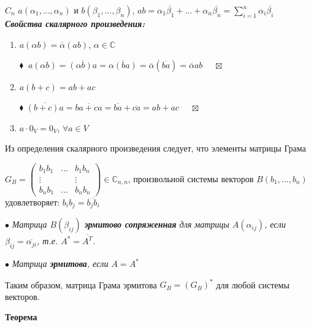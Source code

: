 \documentclass[a4paper, 12pt]{report}
\begin{document}
	$C_{n}$ $a(\alpha_{1}, ...  , \alpha_{n})$ и $b(\beta_{1}, ...  , \beta_{n})$, 
	$ab= \alpha_{1} \overline{\beta_{1}} + ... + \alpha_{n} \overline{\beta_{n}} = \sum\limits_{i=1}^{n}{\alpha_{i} \overline{\beta_{i}}}$\\
	\textit{ \textbf{Свойства скалярного произведения:}}
	\begin{enumerate}
		\item $a(\alpha b) = \overline{\alpha}(ab)$, $\alpha \in \mathbb{C}$
		\par\bigskip
		$\blacklozenge\ $
		$a(\alpha b) = \overline{(\alpha b)a}=\overline{\alpha(ba)}=\overline{\alpha}(\overline{ba})= \overline{\alpha}ab$
		$ \quad \boxtimes$
		
		\item $a(b + c) = ab + ac$
		\par\bigskip
		$\blacklozenge$
		$\overline{(b + c)a}=\overline{ba+ca}=\overline{ba} + \overline{ca} = ab + ac$
		$\quad\boxtimes$
		
		\item  $a \cdot 0_{V}=0_V$, $\forall a \in V$
		
	\end{enumerate}
	\par\bigskip
	Из определения скалярного произведения следует, что элементы матрицы Грама
	\par\bigskip
	$G_B=\begin{pmatrix}
		b_1b_1&...& b_1b_n\\ 
		\vdots &  & \vdots \\ 
		b_nb_1&...& b_nb_n
	\end{pmatrix}\in \mathbb{C}_{n,n}$, произвольной системы векторов $B(b_1, ..., b_n)$ удовлетворяет: $b_ib_j=\overline{b_jb_i}$
	\par\bigskip
	$\bullet$\textit{ Матрица  $B(\beta_{ij})$ \textbf{эрмитово сопряженная} для матрицы $A(\alpha_{ij})$, если $\beta_{ij}=\overline{\alpha_{ji}}$, т.е. $A^*=\overline{A^T}$.}
	\par\bigskip
	$\bullet$ \textit{Матрица \textbf{эрмитова}, если $A=A^*$}
	\par\bigskip
	Таким образом, матрица Грама эрмитова $G_B=(G_B)^*$ для любой системы векторов.
	\par\bigskip
	\textbf{Теорема}
	
\end{document}
